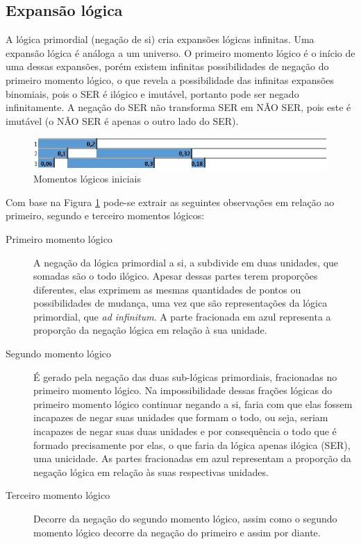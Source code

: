 \subsection{Expansão lógica}
A lógica primordial (negação de si) cria expansões lógicas infinitas. Uma expansão lógica é análoga a um universo. O primeiro momento lógico é o início de uma dessas expansões, porém existem infinitas possibilidades de negação do primeiro momento lógico, o que revela a possibilidade das infinitas expansões binomiais, pois o SER é ilógico e imutável, portanto pode ser negado infinitamente. A negação do SER não transforma SER em NÃO SER, pois este é imutável (o NÃO SER é apenas o outro lado do SER). 
	\begin{figure}[H]
	\caption{Momentos lógicos iniciais}
	\label{fig:third_logical_moment}
	\centering
	\includegraphics[scale=.85]{sections/images/third_logical_moment.jpg}
	\end{figure}

Com base na Figura \ref{fig:third_logical_moment} pode-se extrair as seguintes observações em relação ao primeiro, segundo e terceiro momentos lógicos:
	\begin{description}
	   \item[Primeiro momento lógico] A negação da lógica primordial a si, a subdivide em duas unidades, que somadas são o todo ilógico. Apesar dessas partes terem proporções diferentes, elas exprimem as mesmas quantidades de pontos ou possibilidades de mudança, uma vez que são representações da lógica primordial, que \textit{ad infinitum}. A parte fracionada em azul representa a proporção da negação lógica em relação à sua unidade.
	   \item[Segundo momento lógico] É gerado pela negação das duas sub-lógicas primordiais, fracionadas no primeiro momento lógico. Na impossibilidade dessas frações lógicas do primeiro momento lógico continuar negando a si, faria com que elas fossem incapazes de negar suas unidades que formam o todo, ou seja, seriam incapazes de negar suas duas unidades e por consequência o todo que é formado precisamente por elas, o que faria da lógica apenas ilógica (SER), uma unicidade. As partes fracionadas em azul representam a proporção da negação lógica em relação às suas respectivas unidades.
	   \item[Terceiro momento lógico] Decorre da negação do segundo momento lógico, assim como o segundo momento lógico decorre da negação do primeiro e assim por diante.
	\end{description}


